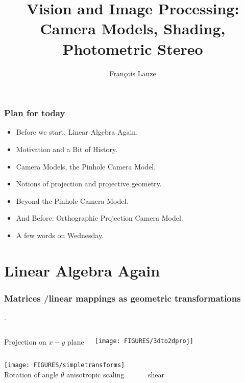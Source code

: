 \documentclass[9pt]{beamer}
\title{Vision and Image Processing:\\ Camera Models, Shading, Photometric Stereo}
\author[F.~Lauze] %
{Fran{\c c}ois Lauze}
\institute[DIKU] %
{
  Department of Computer Science\\
  University of Copenhagen
}
\date[2015-16 B2] %
\begin{document}
\maketitle










\begin{frame}
  \frametitle{Plan for today}
  \begin{itemize}
  \item Before we start, Linear Algebra Again.
  \item Motivation and a Bit of History.
  \item Camera Models, the Pinhole Camera Model.
  \item Notions of projection and projective geometry.
  \item Beyond the Pinhole Camera Model.
  \item And Before: Orthographic Projection Camera Model.
  \item A few words on Wednesday.
  \end{itemize}
\end{frame}


\section{Linear Algebra Again}
\label{sec:linalg}



\begin{frame}
  \frametitle{Matrices /linear mappings as geometric transformations}. 
  \begin{columns}
    \begin{center}
    Projection  on $x-y$ plane
    \end{center}
    \texttt{[image: FIGURES/3dto2dproj]}
  \end{columns}
  \begin{center}
    \texttt{[image: FIGURES/simpletransforms]}\\
    Rotation of angle $\theta$ \hfill anisotropic scaling \hfill ~~~~~~shear~~~~~~~~~~~
  \end{center}
\end{frame}
\end{document}
